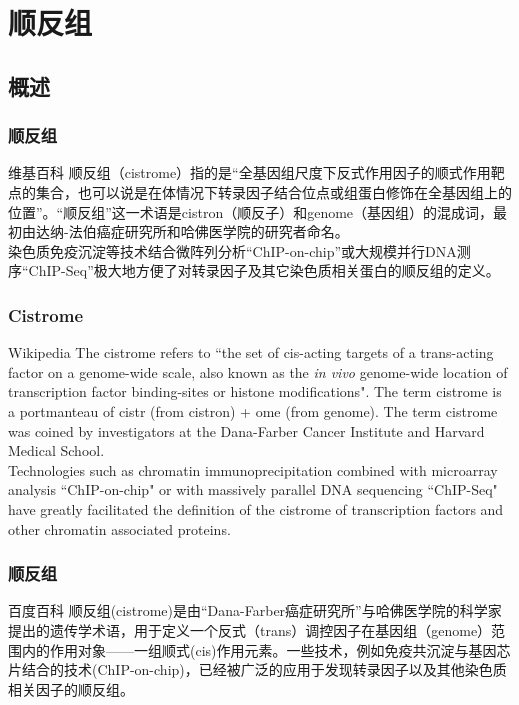\section{顺反组}
\subsection{概述}
\begin{frame}
  \frametitle{顺反组}
  \begin{block}{维基百科}
顺反组（cistrome）指的是“全基因组尺度下反式作用因子的顺式作用靶点的集合，也可以说是在体情况下转录因子结合位点或组蛋白修饰在全基因组上的位置”。“顺反组”这一术语是cistron（顺反子）和genome（基因组）的混成词，最初由达纳-法伯癌症研究所和哈佛医学院的研究者命名。\\
\vspace{0.3em}
    染色质免疫沉淀等技术结合微阵列分析“ChIP-on-chip”或大规模并行DNA测序“ChIP-Seq”极大地方便了对转录因子及其它染色质相关蛋白的顺反组的定义。
  \end{block}
\end{frame}

\begin{frame}
  \frametitle{Cistrome}
  \begin{block}{Wikipedia}
    The cistrome refers to ``the set of cis-acting targets of a trans-acting factor on a genome-wide scale, also known as the \textit{in vivo} genome-wide location of transcription factor binding-sites or histone modifications". The term cistrome is a portmanteau of cistr (from cistron) + ome (from genome). The term cistrome was coined by investigators at the Dana-Farber Cancer Institute and Harvard Medical School.\\
\vspace{0.3em}
    Technologies such as chromatin immunoprecipitation combined with microarray analysis ``ChIP-on-chip" or with massively parallel DNA sequencing ``ChIP-Seq" have greatly facilitated the definition of the cistrome of transcription factors and other chromatin associated proteins.
  \end{block}
\end{frame}

\begin{frame}
  \frametitle{顺反组}
  \begin{block}{百度百科}
    顺反组(cistrome)是由“Dana-Farber癌症研究所”与哈佛医学院的科学家提出的遗传学术语，用于定义一个反式（trans）调控因子在基因组（genome）范围内的作用对象——一组顺式(cis)作用元素。一些技术，例如免疫共沉淀与基因芯片结合的技术(ChIP-on-chip)，已经被广泛的应用于发现转录因子以及其他染色质相关因子的顺反组。
  \end{block}
\end{frame}

